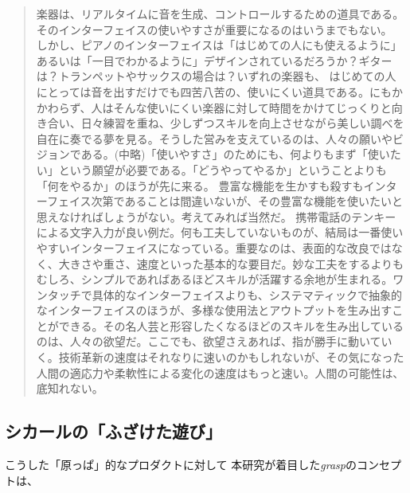 \begin{quote}
  楽器は、リアルタイムに音を生成、コントロールするための道具である。そのインターフェイスの使いやすさが重要になるのはいうまでもない。 しかし、ピアノのインターフェイスは「はじめての人にも使えるように」あるいは「一目でわかるように」デザインされているだろうか？ギターは？トランペットやサックスの場合は？いずれの楽器も、 はじめての人にとっては音を出すだけでも四苦八苦の、使いにくい道具である。にもかかわらず、人はそんな使いにくい楽器に対して時間をかけてじっくりと向き合い、日々練習を重ね、少しずつスキルを向上させながら美しい調べを自在に奏でる夢を見る。そうした営みを支えているのは、人々の願いやビジョンである。(中略)「使いやすさ」のためにも、何よりもまず「使いたい」という願望が必要である。「どうやってやるか」ということよりも「何をやるか」のほうが先に来る。 豊富な機能を生かすも殺すもインターフェイス次第であることは間違いないが、その豊富な機能を使いたいと思えなければしょうがない。考えてみれば当然だ。 携帯電話のテンキーによる文字入力が良い例だ。何も工夫していないものが、結局は一番使いやすいインターフェイスになっている。重要なのは、表面的な改良ではなく、大きさや重さ、速度といった基本的な要目だ。妙な工夫をするよりもむしろ、シンプルであればあるほどスキルが活躍する余地が生まれる。ワンタッチで具体的なインターフェイスよりも、システマティックで抽象的なインターフェイスのほうが、多様な使用法とアウトプットを生み出すことができる。その名人芸と形容したくなるほどのスキルを生み出しているのは、人々の欲望だ。ここでも、欲望さえあれば、指が勝手に動いていく。技術革新の速度はそれなりに速いのかもしれないが、その気になった人間の適応力や柔軟性による変化の速度はもっと速い。人間の可能性は、底知れない。
\end{quote}

\subsection{シカールの「ふざけた遊び」}
こうした「原っぱ」的なプロダクトに対して
本研究が着目した\textit{grasp}のコンセプトは、